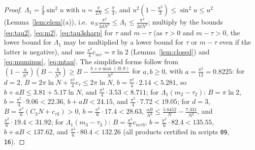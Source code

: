 \documentclass[11pt,a4paper]{article}
\theoremstyle{plain}
\theoremstyle{definition}
\numberwithin{equation}{section}
\begin{document}
\begin{proof}
$\Lambda_1=\frac2d\sin^2u$ with $u=\frac\pi{2N}\le\frac\pi4$, and $u^2(1-\frac{u^2}{3})\le\sin^2u\le u^2$ (Lemma~\ref{lem:elem}(a)), i.e.\ $a_N\frac{\pi^2}{2dN^2}\le\Lambda_1\le\frac{\pi^2}{2dN^2}$; multiply by the bounds \eqref{eq:tau2}, \eqref{eq:m2}, \eqref{eq:tau3sharp} for $\tau$ and $m-\tau$ (as $\tau>0$ and $m-\tau>0$, the lower bound for $\Lambda_1$ may be multiplied by a lower bound for $\tau$ or $m-\tau$ even if the latter is negative), and use $\frac{\pi^2}{4}c_{m\tau}=\pi\ln2$ (Lemma~\ref{lem:closed}) and \eqref{eq:muminus}, \eqref{eq:mtau}. The simplified forms follow from $(1-\frac{a}{N^2})(B-\frac b{N^2})\ge B-\frac{b+a\max(B,0)}{N^2}$ for $a,b\ge0$, with $a=\frac{\pi^2}{12}=0.8225$:
for $d=2$, $B=2\pi\ln N+\frac{\pi^2}4c_\tau\le2\pi\ln N$, $b=\frac{\pi^2}{4}\cdot2.14<5.281$, so $b+aB\le3.81+5.17\ln N$, and $\frac{\pi^2}{4}\cdot3.53<8.711$; for $\Lambda_1(m_2-\tau_2)$: $B=\pi\ln2$, $b=\frac{\pi^2}{4}\cdot9.06<22.36$, $b+aB<24.15$, and $\frac{\pi^2}4\cdot7.72<19.05$;
for $d=3$, $B=\frac{\pi^2}6(C_3N+c_{\tau3})>0$, $b=\frac{\pi^2}{6}\cdot17.4<28.63$, $\frac{aB}{N^2}\le\frac{5.8452}{N}-\frac{7.331}{N^2}$, and $\frac{\pi^2}6\cdot19.4<31.92$; for $\Lambda_1(m_3-\tau_3)$: $B=\frac{\pi^2}{6}c_{m\tau3}$, $b=\frac{\pi^2}6\cdot82.4<135.55$, $b+aB<137.62$, and $\frac{\pi^2}{6}\cdot80.4<132.26$ (all products certified in scripts \texttt{09}, \texttt{16}).
\end{proof}
\end{document}
